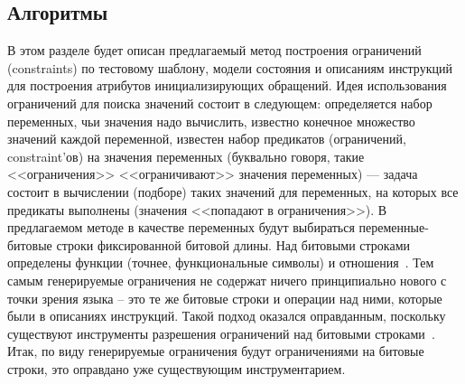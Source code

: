 \subsection{Алгоритмы}
В этом разделе будет описан предлагаемый метод построения ограничений
(constraints) по тестовому шаблону, модели состояния и описаниям инструкций для
построения атрибутов инициализирующих обращений. Идея использования ограничений
для поиска значений состоит в следующем: определяется набор переменных, чьи
значения надо вычислить, известно конечное множество значений каждой переменной,
известен набор предикатов (ограничений, constraint'ов) на значения переменных
(буквально говоря, такие <<ограничения>> <<ограничивают>> значения переменных)
--- задача состоит в вычислении (подборе) таких значений для переменных, на
которых все предикаты выполнены (значения <<попадают в ограничения>>). В
предлагаемом методе в качестве переменных будут выбираться переменные-битовые
строки фиксированной битовой длины. Над битовыми строками определены функции
(точнее, функциональные символы) и отношения~\cite{QFBV}. Тем самым
генерируемые ограничения не содержат ничего принципиально нового с точки зрения
языка -- это те же битовые строки и операции над ними, которые были в описаниях
инструкций. Такой подход оказался оправданным, поскольку существуют инструменты
разрешения ограничений над битовыми строками~\cite{Z3, Yices}. Итак, по виду
генерируемые ограничения будут ограничениями на битовые строки, это оправдано
уже существующим инструментарием.

